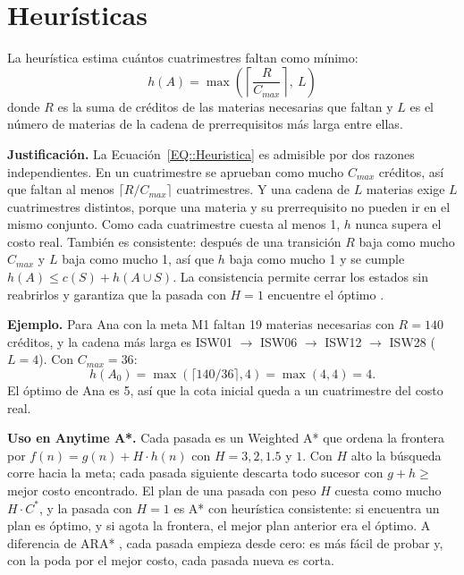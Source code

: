 \section{Heurísticas}
\label{SEC::Heuristica}
La heurística estima cuántos cuatrimestres faltan como mínimo:
\begin{equation}
    \label{EQ::Heuristica}
    h(A) = \max\left(\left\lceil \frac{R}{C_{max}} \right\rceil,\ L\right)
\end{equation}
donde $R$ es la suma de créditos de las materias necesarias que faltan y $L$ es el número de materias de la cadena de prerrequisitos más larga entre ellas.

\textbf{Justificación.} La Ecuación~\eqref{EQ::Heuristica} es admisible por dos razones independientes. En un cuatrimestre se aprueban como mucho $C_{max}$ créditos, así que faltan al menos $\lceil R / C_{max} \rceil$ cuatrimestres. Y una cadena de $L$ materias exige $L$ cuatrimestres distintos, porque una materia y su prerrequisito no pueden ir en el mismo conjunto. Como cada cuatrimestre cuesta al menos 1, $h$ nunca supera el costo real. También es consistente: después de una transición $R$ baja como mucho $C_{max}$ y $L$ baja como mucho 1, así que $h$ baja como mucho 1 y se cumple $h(A) \leq c(S) + h(A \cup S)$. La consistencia permite cerrar los estados sin reabrirlos y garantiza que la pasada con $H = 1$ encuentre el óptimo \cite{hart1968}.

\textbf{Ejemplo.} Para Ana con la meta M1 faltan 19 materias necesarias con $R = 140$ créditos, y la cadena más larga es ISW01 $\to$ ISW06 $\to$ ISW12 $\to$ ISW28 ($L = 4$). Con $C_{max} = 36$:
\[
h(A_0) = \max(\lceil 140/36 \rceil, 4) = \max(4, 4) = 4.
\]
El óptimo de Ana es 5, así que la cota inicial queda a un cuatrimestre del costo real.

\textbf{Uso en Anytime A*.} Cada pasada es un Weighted A* \cite{pohl1970} que ordena la frontera por $f(n) = g(n) + H \cdot h(n)$ con $H = 3, 2, 1.5$ y $1$. Con $H$ alto la búsqueda corre hacia la meta; cada pasada siguiente descarta todo sucesor con $g + h \geq$ mejor costo encontrado. El plan de una pasada con peso $H$ cuesta como mucho $H \cdot C^*$, y la pasada con $H = 1$ es A* con heurística consistente: si encuentra un plan es óptimo, y si agota la frontera, el mejor plan anterior era el óptimo. A diferencia de ARA* \cite{likhachev2003}, cada pasada empieza desde cero: es más fácil de probar y, con la poda por el mejor costo, cada pasada nueva es corta.
